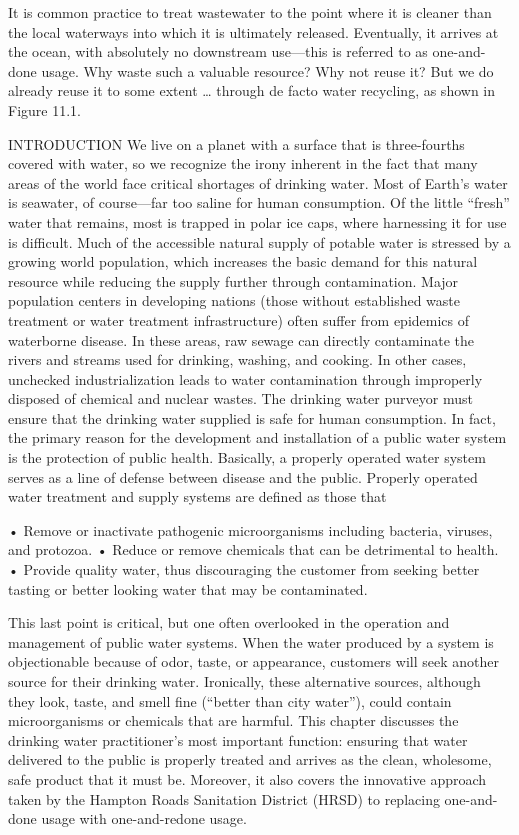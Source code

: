 \documentclass{article}
\begin{document}
It is common practice to treat wastewater to the point where it is
cleaner than the local waterways into which it is ultimately released.
Eventually, it arrives at the ocean, with absolutely no downstream
use---this is referred to as one-and-done usage. Why waste such a
valuable resource? Why not reuse it? But we do already reuse it to some
extent \ldots{} through de facto water recycling, as shown in Figure
11.1.

INTRODUCTION We live on a planet with a surface that is three-fourths
covered with water, so we recognize the irony inherent in the fact that
many areas of the world face critical shortages of drinking water. Most
of Earth's water is seawater, of course---far too saline for human
consumption. Of the little ``fresh'' water that remains, most is trapped
in polar ice caps, where harnessing it for use is difficult. Much of the
accessible natural supply of potable water is stressed by a growing
world population, which increases the basic demand for this natural
resource while reducing the supply further through contamination. Major
population centers in developing nations (those without established
waste treatment or water treatment infrastructure) often suffer from
epidemics of waterborne disease. In these areas, raw sewage can directly
contaminate the rivers and streams used for drinking, washing, and
cooking. In other cases, unchecked industrialization leads to water
contamination through improperly disposed of chemical and nuclear
wastes. The drinking water purveyor must ensure that the drinking water
supplied is safe for human consumption. In fact, the primary reason for
the development and installation of a public water system is the
protection of public health. Basically, a properly operated water system
serves as a line of defense between disease and the public. Properly
operated water treatment and supply systems are defined as those that

• Remove or inactivate pathogenic microorganisms including bacteria,
viruses, and protozoa. • Reduce or remove chemicals that can be
detrimental to health. • Provide quality water, thus discouraging the
customer from seeking better tasting or better looking water that may be
contaminated.

This last point is critical, but one often overlooked in the operation
and management of public water systems. When the water produced by a
system is objectionable because of odor, taste, or appearance, customers
will seek another source for their drinking water. Ironically, these
alternative sources, although they look, taste, and smell fine (``better
than city water''), could contain microorganisms or chemicals that are
harmful. This chapter discusses the drinking water practitioner's most
important function: ensuring that water delivered to the public is
properly treated and arrives as the clean, wholesome, safe product that
it must be. Moreover, it also covers the innovative approach taken by
the Hampton Roads Sanitation District (HRSD) to replacing one-and-done
usage with one-and-redone usage.
\end{document}
